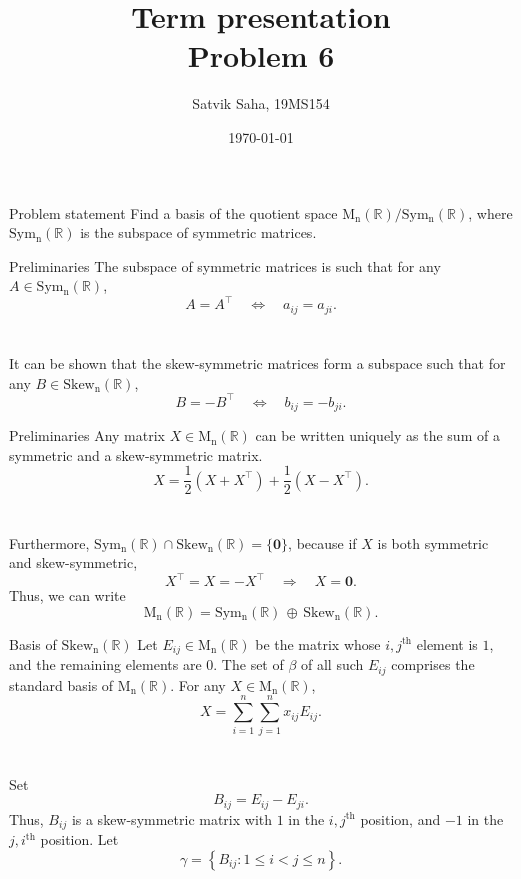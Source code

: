 \documentclass{beamer}
\title{
        Term presentation \\
        Problem 6
}
\author{Satvik Saha, 19MS154}
\institute{
        MA2102: Linear Algebra I \\
        Indian Institute of Science Education and Research, Kolkata
}
\date{\today}
\def\MnR{\operatorname{M_n(\mathbb{R})}}
\def\Sym{\operatorname{Sym_n(\mathbb{R})}}
\def\Skew{\operatorname{Skew_n(\mathbb{R})}}
\begin{document}
        \maketitle

        \begin{frame}{Problem statement}
                Find a basis of the quotient space $\MnR/\Sym$, where $\Sym$ is the subspace of symmetric matrices.
        \end{frame}

        \begin{frame}{Preliminaries}
                The subspace of symmetric matrices is such that for any $A \in \Sym$,
                \[
                        A = A^\top \quad \Leftrightarrow \quad a_{ij} = a_{ji}.
                \] \\~\\
                \pause
                It can be shown that the skew-symmetric matrices form a subspace such that for any $B \in \Skew$,
                \[
                        B = -B^\top \quad \Leftrightarrow \quad b_{ij} = -b_{ji}.
                \]
        \end{frame}

        \begin{frame}{Preliminaries}
                Any matrix $X \in \MnR$ can be written uniquely as the sum of a symmetric and a skew-symmetric matrix.
                \[
                        X = \frac{1}{2}(X + X^\top) + \frac{1}{2}(X - X^\top).
                \] \\~\\
                \pause
                Furthermore, $\Sym \cap \Skew = \{\mathbf{0}\}$, because if $X$ is both symmetric and skew-symmetric,
                \[
                        X^\top = X = -X^\top \quad \Rightarrow \quad X = \mathbf{0}.
                \]
                \pause
                Thus, we can write
                \[
                        \MnR = \Sym \,\oplus\, \Skew.
                \]
        \end{frame}

        \begin{frame}[t]{Basis of $\Skew$}
                Let $E_{ij} \in \MnR$ be the matrix whose $i, j^\text{th}$ element is $1$, and the remaining elements are $0$.
                The set of $\beta$ of all such $E_{ij}$ comprises the standard basis of $\MnR$. For any $X \in \MnR$, 
                \[
                        X = \sum_{i = 1}^n \sum_{j = 1}^n x_{ij}E_{ij}.
                \]\\~\\
                \pause
                Set
                \[
                        B_{ij} = E_{ij} - E_{ji}.
                \]
                Thus, $B_{ij}$ is a skew-symmetric matrix with $1$ in the $i, j^\text{th}$ position,
                and $-1$ in the $j, i^\text{th}$ position.
                Let
                \[
                        \gamma = \left\{B_{ij}\colon 1 \leq i < j \leq n\right\}.
                \]
        \end{frame}
\end{document}
